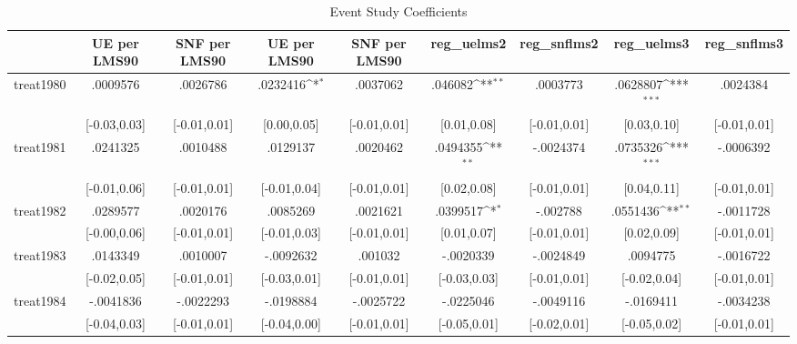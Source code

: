 \begin{table}[htbp]\centering
\def\sym#1{\ifmmode^{#1}\else\(^{#1}\)\fi}
\caption{Event Study Coefficients}
\begin{tabular}{l*{8}{c}}
\hline\hline
            &UE per LMS90         &SNF per LMS90         &UE per LMS90         &SNF per LMS90         &  reg\_uelms2         & reg\_snflms2         &  reg\_uelms3         & reg\_snflms3         \\
\hline
treat1980   &    .0009576         &    .0026786         &    .0232416\sym{*}  &    .0037062         &     .046082\sym{**} &    .0003773         &    .0628807\sym{***}&    .0024384         \\
            &[-0.03,0.03]         &[-0.01,0.01]         & [0.00,0.05]         &[-0.01,0.01]         & [0.01,0.08]         &[-0.01,0.01]         & [0.03,0.10]         &[-0.01,0.01]         \\
treat1981   &    .0241325         &    .0010488         &    .0129137         &    .0020462         &    .0494355\sym{**} &   -.0024374         &    .0735326\sym{***}&   -.0006392         \\
            &[-0.01,0.06]         &[-0.01,0.01]         &[-0.01,0.04]         &[-0.01,0.01]         & [0.02,0.08]         &[-0.01,0.01]         & [0.04,0.11]         &[-0.01,0.01]         \\
treat1982   &    .0289577         &    .0020176         &    .0085269         &    .0021621         &    .0399517\sym{*}  &    -.002788         &    .0551436\sym{**} &   -.0011728         \\
            &[-0.00,0.06]         &[-0.01,0.01]         &[-0.01,0.03]         &[-0.01,0.01]         & [0.01,0.07]         &[-0.01,0.01]         & [0.02,0.09]         &[-0.01,0.01]         \\
treat1983   &    .0143349         &    .0010007         &   -.0092632         &     .001032         &   -.0020339         &   -.0024849         &    .0094775         &   -.0016722         \\
            &[-0.02,0.05]         &[-0.01,0.01]         &[-0.03,0.01]         &[-0.01,0.01]         &[-0.03,0.03]         &[-0.01,0.01]         &[-0.02,0.04]         &[-0.01,0.01]         \\
treat1984   &   -.0041836         &   -.0022293         &   -.0198884         &   -.0025722         &   -.0225046         &   -.0049116         &   -.0169411         &   -.0034238         \\
            &[-0.04,0.03]         &[-0.01,0.01]         &[-0.04,0.00]         &[-0.01,0.01]         &[-0.05,0.01]         &[-0.02,0.01]         &[-0.05,0.02]         &[-0.01,0.01]         \\

\end{tabular}
\end{table}
